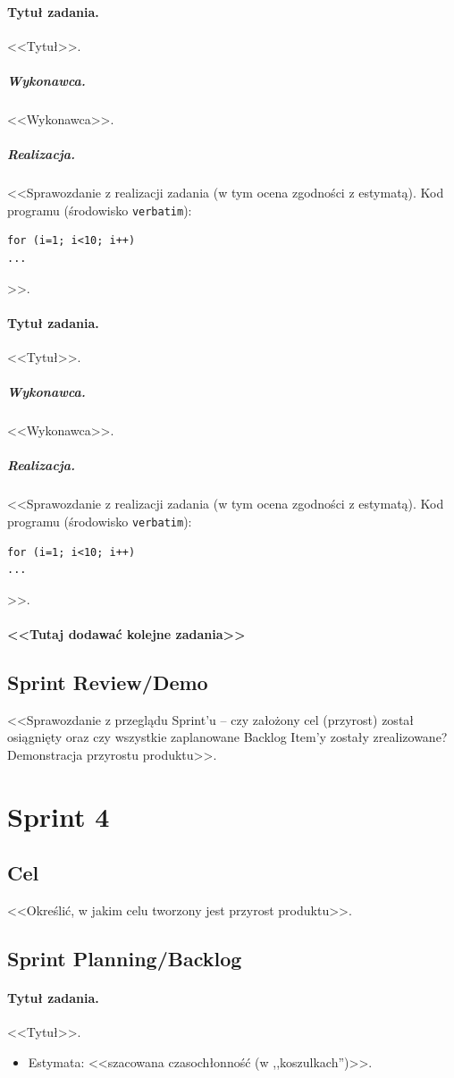 \documentclass[a4paper]{article}
\begin{document}
\paragraph{Tytuł zadania.} <<Tytuł>>.
\subparagraph{Wykonawca.} <<Wykonawca>>.
\subparagraph{Realizacja.} <<Sprawozdanie z realizacji zadania (w tym ocena zgodności z estymatą). Kod programu (środowisko \texttt{verbatim}): \begin{verbatim}
for (i=1; i<10; i++)
...
\end{verbatim}>>.

\paragraph{Tytuł zadania.} <<Tytuł>>.
\subparagraph{Wykonawca.} <<Wykonawca>>.
\subparagraph{Realizacja.} <<Sprawozdanie z realizacji zadania (w tym ocena zgodności z estymatą). Kod programu (środowisko \texttt{verbatim}): \begin{verbatim}
for (i=1; i<10; i++)
...
\end{verbatim}>>.

\paragraph{<<Tutaj dodawać kolejne zadania>>}


\subsection{Sprint Review/Demo}
<<Sprawozdanie z przeglądu Sprint'u -- czy założony cel (przyrost) został osiągnięty oraz czy wszystkie zaplanowane Backlog Item'y zostały zrealizowane? Demonstracja przyrostu produktu>>.

\section{Sprint 4}

\subsection{Cel} <<Określić, w jakim celu tworzony jest przyrost produktu>>.

\subsection{Sprint Planning/Backlog}

\paragraph{Tytuł zadania.} <<Tytuł>>.
\begin{itemize}
	\item Estymata: <<szacowana czasochłonność (w ,,koszulkach'')>>.
\end{itemize}
\end{document}
